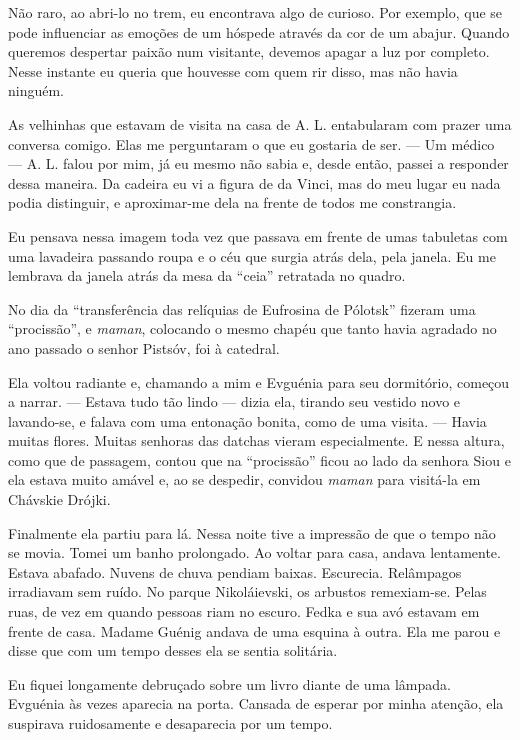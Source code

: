 Não raro, ao abri-lo no trem, eu encontrava algo de curioso. Por
exemplo, que se pode influenciar as emoções de um hóspede através da cor
de um abajur. Quando queremos despertar paixão num visitante, devemos
apagar a luz por completo. Nesse instante eu queria que houvesse com
quem rir disso, mas não havia ninguém.

As velhinhas que estavam de visita na casa de A. L. entabularam com
prazer uma conversa comigo. Elas me perguntaram o que eu gostaria de
ser. --- Um médico --- A. L. falou por mim, já eu mesmo não sabia e,
desde então, passei a responder dessa maneira. Da cadeira eu vi a figura
de da Vinci, mas do meu lugar eu nada podia distinguir, e aproximar-me
dela na frente de todos me constrangia.

Eu pensava nessa imagem toda vez que passava em frente de umas tabuletas
com uma lavadeira passando roupa e o céu que surgia atrás dela, pela
janela. Eu me lembrava da janela atrás da mesa da ``ceia'' retratada no
quadro.

No dia da ``transferência das relíquias de Eufrosina de Pólotsk''
fizeram uma ``procissão'', e \emph{maman}, colocando o mesmo chapéu que
tanto havia agradado no ano passado o senhor Pistsóv, foi à catedral.

Ela voltou radiante e, chamando a mim e Evguénia para seu dormitório,
começou a narrar. --- Estava tudo tão lindo --- dizia ela, tirando seu
vestido novo e lavando-se, e falava com uma entonação bonita, como de
uma visita. --- Havia muitas flores. Muitas senhoras das datchas vieram
especialmente. E nessa altura, como que de passagem, contou que na
``procissão'' ficou ao lado da senhora Siou e ela estava muito amável e,
ao se despedir, convidou \emph{maman} para visitá-la em Chávskie Drójki.

Finalmente ela partiu para lá. Nessa noite tive a impressão de que o
tempo não se movia. Tomei um banho prolongado. Ao voltar para casa,
andava lentamente. Estava abafado. Nuvens de chuva pendiam baixas.
Escurecia. Relâmpagos irradiavam sem ruído. No parque Nikoláievski, os
arbustos remexiam-se. Pelas ruas, de vez em quando pessoas riam no
escuro. Fedka e sua avó estavam em frente de casa. Madame Guénig andava
de uma esquina à outra. Ela me parou e disse que com um tempo desses ela
se sentia solitária.

Eu fiquei longamente debruçado sobre um livro diante de uma lâmpada.
Evguénia às vezes aparecia na porta. Cansada de esperar por minha
atenção, ela suspirava ruidosamente e desaparecia por um tempo.

